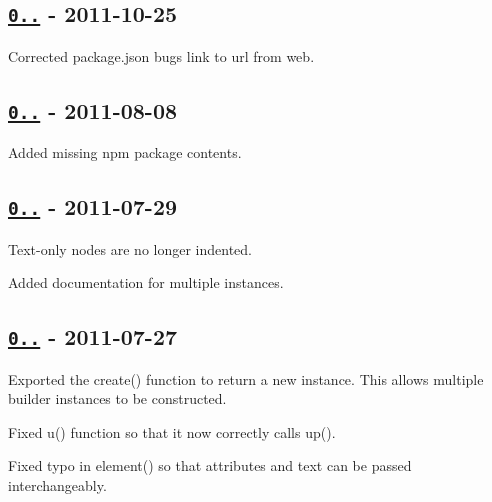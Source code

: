 \subsection*{\href{https://github.com/oozcitak/xmlbuilder-js/compare/v0.1.5...v0.1.6}{\tt 0..} -\/ 2011-\/10-\/25}


\begin{DoxyItemize}
\item Corrected {\ttfamily package.\+json} bugs link to {\ttfamily url} from {\ttfamily web}.
\end{DoxyItemize}

\subsection*{\href{https://github.com/oozcitak/xmlbuilder-js/compare/v0.1.4...v0.1.5}{\tt 0..} -\/ 2011-\/08-\/08}


\begin{DoxyItemize}
\item Added missing npm package contents.
\end{DoxyItemize}

\subsection*{\href{https://github.com/oozcitak/xmlbuilder-js/compare/v0.1.3...v0.1.4}{\tt 0..} -\/ 2011-\/07-\/29}


\begin{DoxyItemize}
\item Text-\/only nodes are no longer indented.
\item Added documentation for multiple instances.
\end{DoxyItemize}

\subsection*{\href{https://github.com/oozcitak/xmlbuilder-js/compare/v0.1.2...v0.1.3}{\tt 0..} -\/ 2011-\/07-\/27}


\begin{DoxyItemize}
\item Exported the {\ttfamily create()} function to return a new instance. This allows multiple builder instances to be constructed.
\item Fixed {\ttfamily u()} function so that it now correctly calls {\ttfamily up()}.
\item Fixed typo in {\ttfamily element()} so that {\ttfamily attributes} and {\ttfamily text} can be passed interchangeably.
\end{DoxyItemize}

